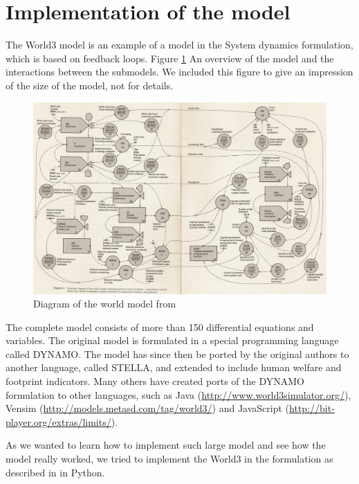 \documentclass[10pt,a4paper]{scrartcl}
\begin{document}
\section*{Implementation of the model}

The World3 model is an example of a model in the System dynamics formulation, which is based on feedback loops. Figure \ref{world3} An overview of the model and the interactions between the submodels. We included this figure to give an impression of the size of the model, not for details.

\begin{figure}[h]
\centering
\includegraphics[width=\textwidth]{./plaatjes/model.jpg}
\caption{Diagram of the world model from \cite{forresterworld}}
\label{world3}
\end{figure}

The complete model consists of more than 150 differential equations and variables. The original model is formulated in a special programming language called DYNAMO. The model has since then be ported by the original authors to another language, called STELLA, and extended to include human welfare and footprint indicators. Many others have created ports of the DYNAMO formulation to other languages, such as Java (\url{http://www.world3simulator.org/}), Vensim (\url{http://models.metasd.com/tag/world3/}) and JavaScript (\url{http://bit-player.org/extras/limits/}).

As we wanted to learn how to implement such large model and see how the model really worked, we tried to implement the World3 in the formulation as described in \cite{thissen1978investigations} in Python.
\end{document}
